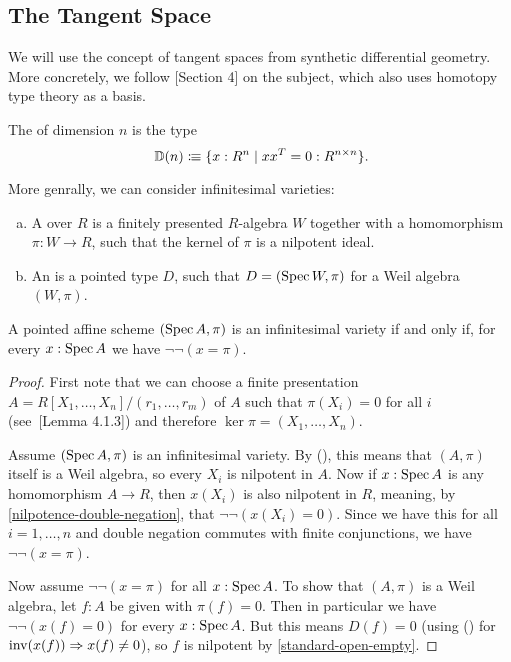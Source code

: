 \subsection{The Tangent Space}

We will use the concept of tangent spaces from synthetic differential geometry.
More concretely, we follow \cite{david-orbifolds}[Section 4]
on the subject, which also uses homotopy type theory as a basis.

\begin{definition}
  The  of dimension $n$ is the type
  \[ \D(n)\colonequiv \{x:R^n \mid xx^T = 0 : R^{n \times n}\}\rlap{.}\]
\end{definition}

More genrally, we can consider infinitesimal varieties:

\begin{definition}
  \begin{enumerate}[(a)]
  \item A  over $R$ is a finitely presented $R$-algebra
    $W$ together with a homomorphism $\pi : W \to R$, such that the kernel of $\pi$ is a nilpotent ideal.
  \item An  is a pointed type $D$,
    such that $D = (\operatorname{Spec} W, \pi)$ for a Weil algebra $(W, \pi)$.
  \end{enumerate}
\end{definition}

\begin{lemma}%
  \label{characterization-infinitesimal-variety}
  A pointed affine scheme $(\operatorname{Spec} A, \pi)$
  is an infinitesimal variety
  if and only if,
  for every $x : \operatorname{Spec} A$ we have $\lnot \lnot (x = \pi)$.
\end{lemma}

\begin{proof}
  First note that we can choose a finite presentation
  $A = R[X_1, \dots, X_n]/(r_1, \dots, r_m)$
  of $A$
  such that $\pi(X_i) = 0$ for all $i$
  (see~\cite{david-orbifolds}[Lemma 4.1.3])
  and therefore $\ker \pi = (X_1, \dots, X_n)$.

  Assume $(\operatorname{Spec} A, \pi)$ is an infinitesimal variety.
  By (), this means that $(A, \pi)$ itself is a Weil algebra,
  so every $X_i$ is nilpotent in $A$.
  Now if $x : \operatorname{Spec} A$ is any homomorphism $A \to R$,
  then $x(X_i)$ is also nilpotent in $R$,
  meaning, by \cref{nilpotence-double-negation}, that $\lnot \lnot (x(X_i) = 0)$.
  Since we have this for all $i = 1, \dots, n$
  and double negation commutes with finite conjunctions,
  we have $\lnot \lnot (x = \pi)$.

  Now assume $\lnot \lnot (x = \pi)$ for all $x : \operatorname{Spec} A$.
  To show that $(A, \pi)$ is a Weil algebra,
  let $f : A$ be given with $\pi(f) = 0$.
  Then in particular we have $\lnot \lnot (x(f) = 0)$
  for every $x : \operatorname{Spec} A$.
  But this means $D(f) = 0$
  (using () for $\mathrm{inv}(x(f)) \Rightarrow x(f) \neq 0$),
  so $f$ is nilpotent by \cref{standard-open-empty}.
\end{proof}

